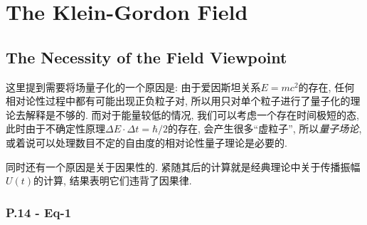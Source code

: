 \documentclass[10pt,b5paper,openany]{book}
\begin{document}
\chapter{The Klein-Gordon Field}

\section{The Necessity of the Field Viewpoint}

这里提到需要将场量子化的一个原因是:  由于爱因斯坦关系$E = mc^2$的存在, 任何相对论性过程中都有可能出现正负粒子对, 所以用只对单个粒子进行了量子化的理论去解释是不够的. 而对于能量较低的情况, 我们可以考虑一个存在时间极短的态, 此时由于不确定性原理$\Delta E \cdot \Delta t = \hbar /2$的存在, 会产生很多“虚粒子”, 所以\textit{量子场论}, 或着说可以处理数目不定的自由度的相对论性量子理论是必要的. 

同时还有一个原因是关于因果性的. 紧随其后的计算就是经典理论中关于传播振幅$U(t)$的计算, 结果表明它们违背了因果律. 

\begin{center}
\end{center}

\subsection{P.14 - Eq-1}
\end{document}
